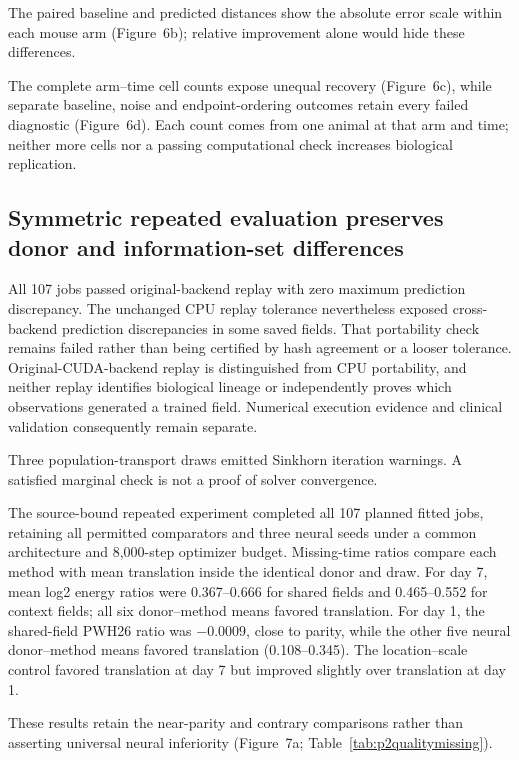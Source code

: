 \documentclass[10pt,a4paper]{article}
\begin{document}
The paired baseline and predicted distances show the absolute error scale within each mouse arm (Figure~6b); relative improvement alone would hide these differences.

The complete arm--time cell counts expose unequal recovery (Figure~6c), while separate baseline, noise and endpoint-ordering outcomes retain every failed diagnostic (Figure~6d). Each count comes from one animal at that arm and time; neither more cells nor a passing computational check increases biological replication.




\subsection{Symmetric repeated evaluation preserves donor and information-set differences}

All 107 jobs passed original-backend replay with zero maximum prediction discrepancy. The unchanged CPU replay tolerance nevertheless exposed cross-backend prediction discrepancies in some saved fields. That portability check remains failed rather than being certified by hash agreement or a looser tolerance. Original-CUDA-backend replay is distinguished from CPU portability, and neither replay identifies biological lineage or independently proves which observations generated a trained field. Numerical execution evidence and clinical validation consequently remain separate.

Three population-transport draws emitted Sinkhorn iteration warnings. A satisfied marginal check is not a proof of solver convergence.

The source-bound repeated experiment completed all 107 planned fitted jobs, retaining all permitted comparators and three neural seeds under a common architecture and 8,000-step optimizer budget. Missing-time ratios compare each method with mean translation inside the identical donor and draw. For day 7, mean log2 energy ratios were 0.367--0.666 for shared fields and 0.465--0.552 for context fields; all six donor--method means favored translation. For day 1, the shared-field PWH26 ratio was $-0.0009$, close to parity, while the other five neural donor--method means favored translation (0.108--0.345). The location--scale control favored translation at day 7 but improved slightly over translation at day 1.

These results retain the near-parity and contrary comparisons rather than asserting universal neural inferiority (Figure~7a\label{call:p2f8}; Table~\ref{tab:p2qualitymissing}).
\end{document}
